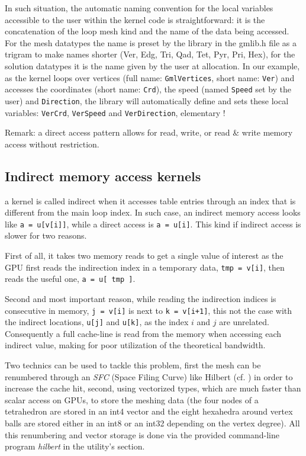 \documentclass[a4paper,12pt]{article}
\begin{document}
In such situation, the automatic naming convention for the local variables accessible to the user within the kernel code is straightforward: it is the concatenation of the loop mesh kind and the name of the data being accessed. For the mesh datatypes the name is preset by the library in the gmlib.h file as a trigram to make names shorter (Ver, Edg, Tri, Qad, Tet, Pyr, Pri, Hex), for the solution datatypes it is the name given by the user at allocation. In our example, as the kernel loops over vertices (full name: {\tt GmlVertices}, short name: {\tt Ver}) and accesses the coordinates (short name: {\tt Crd}), the speed (named {\tt Speed} set by the user) and {\tt Direction}, the library will automatically define and sets these local variables: {\tt VerCrd}, {\tt VerSpeed} and {\tt VerDirection}, elementary !

Remark: a direct access pattern allows for read, write, or read \& write memory access without restriction.

\subsection{Indirect memory access kernels}
\label{sec:kernels_indirects}
a kernel is called indirect when it accesses table entries through an index that is different from the main loop index. In such case, an indirect memory access looks like {\tt a = u[v[i]]}, while a direct access is {\tt a = u[i]}. This kind if indirect access is slower for two reasons.

First of all, it takes two memory reads to get a single value of interest as the GPU first reads the indirection index in a temporary data, {\tt tmp = v[i]}, then reads the useful one, {\tt a = u[ tmp ]}.

Second and most important reason, while reading the indirection indices is consecutive in memory, {\tt j = v[i]} is next to {\tt k = v[i+1]}, this not the case with the indirect locations, {\tt u[j]} and {\tt u[k]}, as the index $i$ and $j$ are unrelated. Consequently a full cache-line is read from the memory when accessing each indirect value, making for poor utilization of the theoretical bandwidth.

Two technics can be used to tackle this problem, first the mesh can be renumbered through an \emph{SFC} (Space Filing Curve) like Hilbert (cf. \cite{peano_hilbert}) in order to increase the cache hit, second, using vectorized types, which are much faster than scalar access on GPUs, to store the meshing data (the four nodes of a tetrahedron are stored in an int4 vector and the eight hexahedra around vertex balls are stored either in an int8 or an int32 depending on the vertex degree). All this renumbering and vector storage is done via the provided command-line program \emph{hilbert} in the utility’s section.
\end{document}
